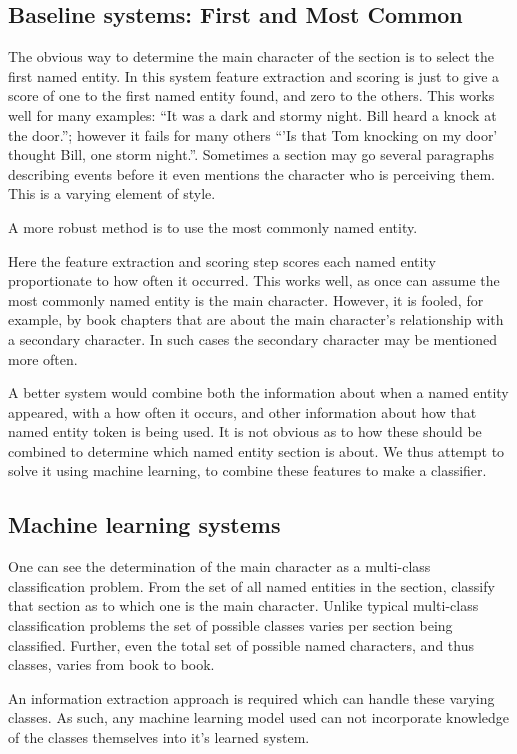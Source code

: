 \documentclass[11pt,a4paper]{article}
\begin{document}
\subsection{Baseline systems: First and Most Common}
The obvious way to determine the main character of the section is to select the first named entity.
In this system feature extraction and scoring is just to give a score of one to the first named entity found, and zero to the others.
This works well for many examples: ``It was a dark and stormy night. Bill heard a knock at the door.''; however it fails for many others ``'Is that Tom knocking on my door' thought Bill, one storm night.''.
Sometimes a section  may go several paragraphs describing events before it even mentions the character who is perceiving them.
This is a varying element of style.

A more robust method is to use the most commonly named entity.

Here the feature extraction and scoring step scores each named entity proportionate to how often it occurred.
This works well, as once can assume the most commonly named entity is the main character.
However, it is fooled, for example, by book chapters that are about the main character's relationship with a secondary character.
In such cases the secondary character may be mentioned more often.

A better system would combine both the information about when a named entity appeared,
with a how often it occurs, and other information about how that named entity token is being used.
It is not obvious as to how these should be combined to determine which named entity section is about.
We thus attempt to solve it using machine learning, to combine these features to make a classifier.

\subsection{Machine learning systems}
One can see the determination of the main character as a multi-class classification problem.
From the set of all named entities in the section, classify that section as to which one is the main character.
Unlike typical multi-class classification problems
the set of possible classes varies per section being classified.
Further, even the total set of possible named characters, and thus classes, varies from book to book.

An information extraction approach is required which can handle these varying classes.
As such, any machine learning model used can not incorporate knowledge of the classes themselves into it's learned system.
\end{document}
